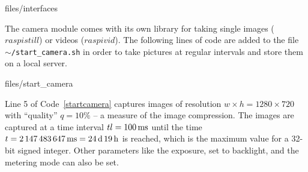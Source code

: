 \begin{center}
\begin{minipage}{0.9\linewidth}
    \begin{lstinputlisting}[caption=\texttt{/etc/network/interfaces}., label=interfaces, frame=none]
        {files/interfaces}
\end{lstinputlisting}
\end{minipage}
\end{center}

The camera module comes with its own library for taking single images ($raspistill$) or videos ($raspivid$).
The following lines of code are added to the file \texttt{$\sim$/start\_camera.sh} in order to take pictures at regular intervals and store them on a local server. 
\begin{center}
\begin{minipage}{0.9\linewidth}
\begin{lstinputlisting}[caption=\texttt{$\sim$/start\_camera.sh}., label=startcamera, frame=none]
    {files/start_camera}
\end{lstinputlisting}
\end{minipage}
\end{center}

Line 5 of Code~\ref{startcamera} captures images of resolution $w\times h = 1280 \times 720$ with ``quality'' $q=10\%$ -- a measure of the image compression. 
The images are captured at a time interval $tl = \SI{100}{ms}$ until the time $t = \SI{2147483647}{ms} = \SI{24}{d}\,\SI{19}{h}$ is reached, which is the maximum value for a 32-bit signed integer.
Other parameters like the exposure, set to backlight, and the metering mode can also be set. 

